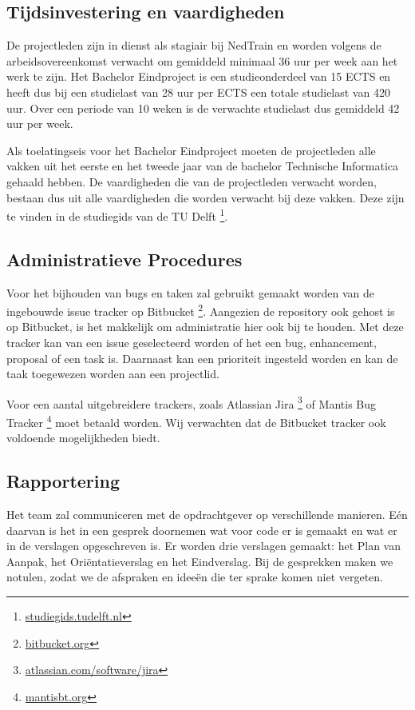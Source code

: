 \subsection{Tijdsinvestering en vaardigheden}
De projectleden zijn in dienst als stagiair bij NedTrain en worden volgens de arbeidsovereenkomst verwacht om gemiddeld minimaal 36 uur per week aan het werk te zijn. Het Bachelor Eindproject is een studieonderdeel van 15 ECTS en heeft dus bij een studielast van 28 uur per ECTS een totale studielast van 420 uur. Over een periode van 10 weken is de verwachte studielast dus gemiddeld 42 uur per week.

Als toelatingseis voor het Bachelor Eindproject moeten de projectleden alle vakken uit het eerste en het tweede jaar van de bachelor Technische Informatica gehaald hebben. De vaardigheden die van de projectleden verwacht worden, bestaan dus uit alle vaardigheden die worden verwacht bij deze vakken. Deze zijn te vinden in de studiegids van de TU Delft \footnote{\url{studiegids.tudelft.nl}}.

\subsection{Administratieve Procedures}
Voor het bijhouden van bugs en taken zal gebruikt gemaakt worden van de ingebouwde issue tracker op Bitbucket \footnote{\url{bitbucket.org}}. Aangezien de repository ook gehost is op Bitbucket, is het makkelijk om administratie hier ook bij te houden. Met deze tracker kan van een issue geselecteerd worden of het een bug, enhancement, proposal of een task is. Daarnaast kan een prioriteit ingesteld worden en kan de taak toegewezen worden aan een projectlid.

Voor een aantal uitgebreidere trackers, zoals Atlassian Jira \footnote{\url{atlassian.com/software/jira}} of Mantis Bug Tracker \footnote{\url{mantisbt.org}} moet betaald worden. Wij verwachten dat de Bitbucket tracker ook voldoende mogelijkheden biedt.

\subsection{Rapportering}
Het team zal communiceren met de opdrachtgever op verschillende manieren. E\'en daarvan is het in een gesprek doornemen wat voor code er is gemaakt en wat er in de verslagen opgeschreven is. Er worden drie verslagen gemaakt: het Plan van Aanpak, het Ori\"entatieverslag en het Eindverslag. Bij de gesprekken maken we notulen, zodat we de afspraken en idee\"en die ter sprake komen niet vergeten.

